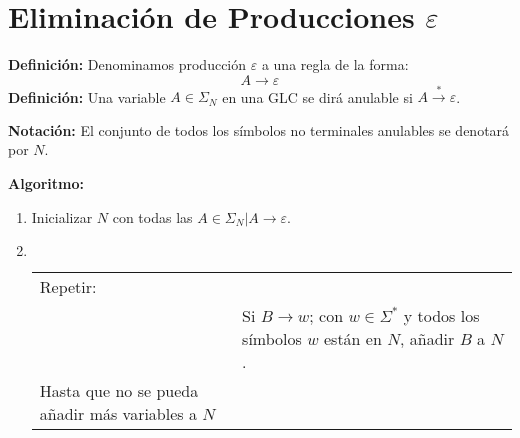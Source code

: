 \chapter{Eliminación de Producciones $\varepsilon$}
\textbf{Definición: }Denominamos producción $\varepsilon$ a una regla de la forma:
$$A\rightarrow \varepsilon$$
\textbf{Definición: }Una variable $A\in\Sigma_N$ en una GLC se dirá anulable si $A\xrightarrow{*}\varepsilon$.

\textbf{Notación: }El conjunto de todos los símbolos no terminales anulables se denotará por $N$.

\textbf{Algoritmo: }
\begin{enumerate}
\item Inicializar $N$ con todas las $A\in\Sigma_N|A\rightarrow\varepsilon$.
\item $\;$\\
\begin{tabular}{p{4cm}p{8cm}}
Repetir:	&	\\
		&Si $B\rightarrow w$; con $w\in\Sigma^*$ y todos los símbolos $w$ están en $N$, añadir $B$ a $N$.\\
Hasta que no se pueda añadir más variables a $N$		&
\end{tabular}
\end{enumerate}

